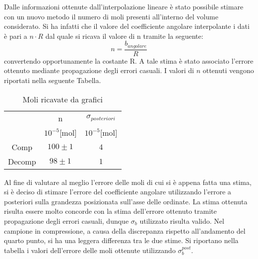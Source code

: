 \documentclass[a4paper,11pt,oneside]{article}
\begin{document}
Dalle informazioni ottenute dall'interpolazione lineare è stato possibile stimare con un nuovo metodo il numero di moli presenti all'interno del volume considerato. Si ha infatti che il valore del coefficiente angolare interpolante i dati è pari a $n \cdot R$ dal quale si ricava il valore di n tramite la seguente: 
\begin{equation*}
    n= \frac{b_{angolare}}{R}
\end{equation*}
convertendo opportunamente la costante R. A tale stima è stato associato l'errore ottenuto mediante propagazione degli errori casuali. I valori di $n$ ottenuti vengono riportati nella seguente Tabella. 

\begin{table}[h!]
    \centering
    \begin{tabular}{|c|c|c|}
        \cline{2-3}
        \multicolumn{1}{c|}{}& n & $\sigma_{posteriori}$\\ 
        \multicolumn{1}{c|}{}& $10^{-5}$[mol] & $10^{-5}$[mol]\\\hline
        \rowcolor[rgb]{0.85,0.85,0.85}Comp & $100\pm1$ & $4$\\ \hline
        Decomp & $98\pm1$ & $1$\\ \hline
    \end{tabular}
    \caption{Moli ricavate da grafici}
    \label{tab:moli_grafici}
\end{table}

Al fine di valutare al meglio l'errore delle moli di cui si è appena fatta una stima, si è deciso di stimare l'errore del coefficiente angolare utilizzando l'errore a posteriori sulla grandezza posizionata sull'asse delle ordinate. La stima ottenuta risulta essere molto concorde con la stima  dell'errore ottenuto tramite propagazione degli errori casuali, dunque $\sigma_b$ utilizzato risulta valido. Nel campione in compressione, a causa della discrepanza rispetto all'andamento del quarto punto, si ha una leggera differenza tra le due stime.
Si riportano nella tabella i valori dell'errore delle moli ottenute utilizzando $\sigma_b^{post}$.






\end{document}
